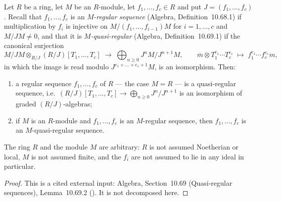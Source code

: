 \begin{lemma}
\label{lem:pc-regular-quasi-regular}
Let $R$ be a ring, let $M$ be an $R$-module, let $f_1,\dots,f_c\in R$ and
put $J=(f_1,\dots,f_c)$.  Recall that $f_1,\dots,f_c$ is an
\emph{$M$-regular sequence} (Algebra, Definition~10.68.1) if multiplication
by $f_i$ is injective on $M/(f_1,\dots,f_{i-1})M$ for $i=1,\dots,c$ and
$M/JM\neq0$, and that it is \emph{$M$-quasi-regular} (Algebra,
Definition~10.69.1) if the canonical surjection
\[
M/JM\otimes_{R/J}(R/J)[T_1,\dots,T_c]\;\longrightarrow\;
\bigoplus_{n\ge0}J^nM/J^{n+1}M,
\qquad
\overline m\otimes T_1^{e_1}\cdots T_c^{e_c}\;\longmapsto\;
f_1^{e_1}\cdots f_c^{e_c}m ,
\]
in which the image is read modulo $J^{e_1+\dots+e_c+1}M$, is an
isomorphism.  Then:
\begin{enumerate}
\item a regular sequence $f_1,\dots,f_c$ of $R$ --- the case $M=R$ --- is a
quasi-regular sequence, i.e.\ $(R/J)[T_1,\dots,T_c]\to\bigoplus_{n\ge0}
J^n/J^{n+1}$ is an isomorphism of graded $(R/J)$-algebras;
\item if $M$ is an $R$-module and $f_1,\dots,f_c$ is an $M$-regular
sequence, then $f_1,\dots,f_c$ is an $M$-quasi-regular sequence.
\end{enumerate}
The ring $R$ and the module $M$ are arbitrary: $R$ is not assumed
Noetherian or local, $M$ is not assumed finite, and the $f_i$ are not
assumed to lie in any ideal in particular.
\end{lemma}
\begin{proof}
This is a cited external input: Algebra, Section~10.69 (Quasi-regular
sequences), Lemma~10.69.2 ().  It is not decomposed
here.
\end{proof}

